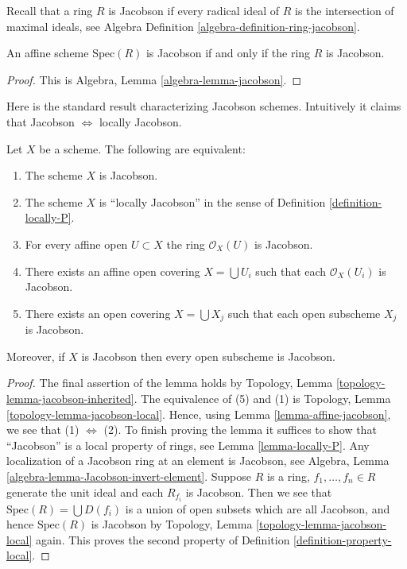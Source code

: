 \noindent
Recall that a ring $R$ is Jacobson if every radical ideal of $R$
is the intersection of maximal ideals, see Algebra Definition
\ref{algebra-definition-ring-jacobson}.

\begin{lemma}
\label{lemma-affine-jacobson}
An affine scheme $\text{Spec}(R)$ is Jacobson if and only if
the ring $R$ is Jacobson.
\end{lemma}

\begin{proof}
This is Algebra, Lemma \ref{algebra-lemma-jacobson}.
\end{proof}

\noindent
Here is the standard result characterizing Jacobson schemes.
Intuitively it claims that Jacobson $\Leftrightarrow$ locally Jacobson.

\begin{lemma}
\label{lemma-locally-jacobson}
Let $X$ be a scheme. The following are equivalent:
\begin{enumerate}
\item The scheme $X$ is Jacobson.
\item The scheme $X$ is ``locally Jacobson'' in the sense of
Definition \ref{definition-locally-P}.
\item For every affine open $U \subset X$ the ring $\mathcal{O}_X(U)$
is Jacobson.
\item There exists an affine open covering $X = \bigcup U_i$ such that
each $\mathcal{O}_X(U_i)$ is Jacobson.
\item There exists an open covering $X = \bigcup X_j$
such that each open subscheme $X_j$ is Jacobson.
\end{enumerate}
Moreover, if $X$ is Jacobson then every open subscheme
is Jacobson.
\end{lemma}

\begin{proof}
The final assertion of the lemma holds by
Topology, Lemma \ref{topology-lemma-jacobson-inherited}.
The equivalence of (5) and (1) is
Topology, Lemma \ref{topology-lemma-jacobson-local}.
Hence, using Lemma \ref{lemma-affine-jacobson},
we see that (1) $\Leftrightarrow$ (2).
To finish proving the lemma it suffices to show that ``Jacobson''
is a local property of rings, see Lemma \ref{lemma-locally-P}.
Any localization of a Jacobson ring at an element is Jacobson, see
Algebra, Lemma \ref{algebra-lemma-Jacobson-invert-element}.
Suppose $R$ is a ring, $f_1, \ldots, f_n \in R$ generate the unit
ideal and each $R_{f_i}$ is Jacobson. Then we see that
$\text{Spec}(R) = \bigcup D(f_i)$ is a union of open subsets
which are all Jacobson, and hence $\text{Spec}(R)$ is Jacobson
by Topology, Lemma \ref{topology-lemma-jacobson-local} again.
This proves the second property of Definition \ref{definition-property-local}.
\end{proof}













